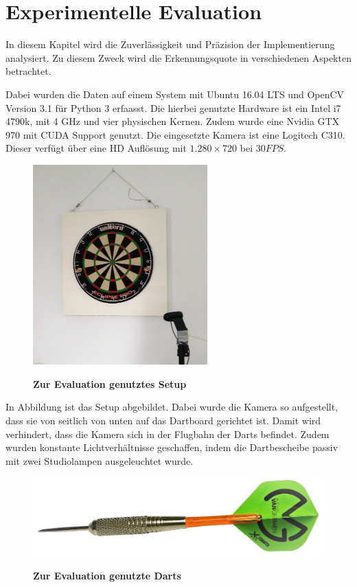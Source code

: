 
\chapter{Experimentelle Evaluation}
\label{chap:evaluation}
In diesem Kapitel wird die Zuverlässigkeit und Präzision der Implementierung analysiert. Zu diesem Zweck wird die Erkennungsquote in verschiedenen Aspekten betrachtet.

Dabei wurden die Daten auf einem System mit Ubuntu 16.04 LTS und OpenCV Version 3.1 für Python 3 erfaasst. Die hierbei genutzte Hardware ist ein Intel i7 4790k, mit 4 GHz und vier physischen Kernen. Zudem wurde eine Nvidia GTX 970 mit CUDA Support genutzt.
Die eingesetzte Kamera ist eine Logitech C310. Dieser verfügt über eine HD Auflösung mit  $1.280\times720$ bei $30FPS$. 

\begin{figure}[ht]
\centering
\includegraphics[width=0.6\textwidth]{media/testsetup}\\
\caption{\textbf{Zur Evaluation genutztes Setup}}
\label{Fig:testsetup}
\end{figure}
In Abbildung  ist das Setup abgebildet. Dabei wurde die Kamera so aufgestellt, dass sie von seitlich von unten auf das Dartboard gerichtet ist. Damit wird verhindert, dass die Kamera sich in der Flugbahn der Darts befindet. Zudem wurden konstante Lichtverhältnisse geschaffen, indem die Dartbescheibe passiv mit zwei Studiolampen ausgeleuchtet wurde.
\begin{figure}[ht]
\centering
\includegraphics[width=\textwidth]{media/MyDart.png}\\
\caption{\textbf{Zur Evaluation genutzte Darts}}
\label{Fig:mydart}
\end{figure}

